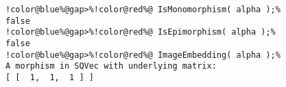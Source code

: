 \begin{Verbatim}[commandchars=!@\%,frame=single]
!color@blue%@gap>%!color@red%@ IsMonomorphism( alpha );%
false
!color@blue%@gap>%!color@red%@ IsEpimorphism( alpha );%
false
!color@blue%@gap>%!color@red%@ ImageEmbedding( alpha );%
A morphism in SQVec with underlying matrix:
[ [  1,  1,  1 ] ]

\end{Verbatim}
